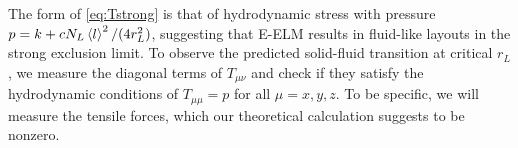 \documentclass[nofootinbib,preprint,floatfix,endfloats]{revtex4} %
\begin{document}
The form of \eqref{eq:Tstrong} is that of  hydrodynamic stress with pressure $ p =  k + c{N_L \left<l\right>^2/( 4r_L^2)}$, suggesting that E-ELM results in fluid-like layouts in the strong exclusion limit.
To observe the predicted solid-fluid transition at critical $r_L$, we measure the diagonal terms of $T_{\mu\nu}$ and check if they satisfy the hydrodynamic conditions of $T_{\mu\mu}=p$ for all $\mu=x,y,z$. 
To be specific, we will measure the tensile forces, which our theoretical calculation suggests to be nonzero.  



 
\end{document}
